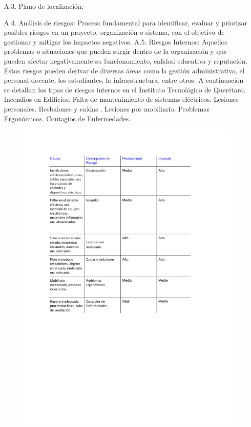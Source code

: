     A.3. Plano de localización;
    
    
    A.4. Análisis de riesgos:
    Proceso fundamental para identificar, evaluar y priorizar posibles riesgos en un proyecto,
    organización o sistema, con el objetivo de gestionar y mitigar los impactos negativos.
    A.5. Riesgos Internos:
    Aquellos problemas o situaciones que pueden surgir dentro de la organización y que pueden afectar
    negativamente su funcionamiento, calidad educativa y reputación. Estos riesgos pueden derivar de
    diversas áreas como la gestión administrativa, el personal docente, los estudiantes, la infraestructura,
    entre otros. A continuación se detallan los tipos de riesgos internos en el Instituto Tecnológico de
    Querétaro.
    Incendios en Edificios.
    Falta de mantenimiento de sistemas eléctricos.
    Lesiones personales.
    Resbalones y caídas .
    Lesiones por mobiliario.
    Problemas Ergonómicos.
    Contagios de Enfermedades.
    \begin{figure}[H]
        \centering
        \includegraphics[trim = {0mm 0mm 0mm 0mm},clip,scale=0.3]{20/img/Riesgos Internos.pdf}
        \end{figure}
